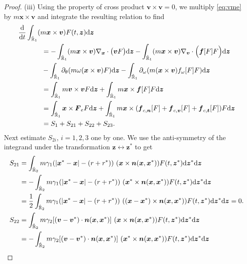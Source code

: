 \documentclass[a4paper,11pt]{article}
\numberwithin{equation}{section}
\theoremstyle{definition}
\newcommand{\bfx}{\boldsymbol{x}}
\newcommand{\bfz}{\boldsymbol{z}}
\newcommand{\bfv}{\boldsymbol{v}}
\newcommand{\bfn}{\boldsymbol{n}}
\newcommand{\bft}{\boldsymbol{t}}
\newcommand{\bff}{\boldsymbol{f}}
\newcommand{\bfF}{\boldsymbol{F}}
\newcommand{\bbr}{\mathbb R}
\def\d{{  \rm d}}
\begin{document}
\begin{proof}
\vspace{0.1cm}
\noindent (iii) 
Using the property of cross product $\bfv\times \bfv=0$, we multiply \eqref{eq:vme} by $m\bfx\times \bfv$ and integrate the resulting relation to find
\begin{align*}
&\frac{\d}{\d t}\int_{\hat{\bbr}_1} (m\bfx\times \bfv)F(t,\bfz) \d\bfz\\
&\hspace{1.2cm}=-\int_{\hat{\bbr}_1}(m\bfx\times \bfv)\nabla_{\bfx} \cdot \big (\bfv F \big)  \d\bfz
-  \int_{\hat{\bbr}_1}(m\bfx\times \bfv)\nabla_{\bfv} \cdot  \Big ( \bff[F] F  \Big ) \d\bfz\\
&\hspace{1.2cm}-\int_{\hat{\bbr}_1}\partial_\theta (m\omega (\bfx\times \bfv) F) \d\bfz
- \int_{\hat{\bbr}_1}\partial_{\omega} (m(\bfx\times \bfv) f_{\omega}[F] F)\d\bfz\\
&\hspace{1.2cm}= \int_{\hat{\bbr}_1}m\bfv\times \bfv F   \d\bfz
+ \int_{\hat{\bbr}_1} m\bfx\times \bff[F] F  \d\bfz\\
&\hspace{1.2cm}=\int_{\hat{\bbr}_1} \bfx\times \bfF_e F \d\bfz+\int_{\hat{\bbr}_1} m\bfx\times (\bff_{c, \bfn}[F]+\bff_{c, \bfv}[F]+\bff_{c, \bft}[F]) F  \d\bfz\\
&\hspace{1.2cm}=S_1+S_{21}+S_{22}+S_{23}.
\end{align*}
Next estimate $S_{2i}$, $i=1,2,3$ one by one.
We use the anti-symmetry of the integrand under the transformation $\bfz\leftrightarrow \bfz^*$ to get
\begin{align*}
S_{21} 
&=  \int_{\hat{\bbr}_2}  m\gamma_1  (|\bfx^* - \bfx| - (r + r^*)) \ (\bfx\times  \bfn(\bfx, \bfx^*))  F(t, \bfz^*)\d\bfz^*\d \bfz\\
&=  -\int_{\hat{\bbr}_2}  m\gamma_1  (|\bfx^* - \bfx| - (r + r^*)) \ (\bfx^*\times  \bfn(\bfx, \bfx^*))  F(t, \bfz^*)\d\bfz^*\d \bfz\\
&=  \frac12\int_{\hat{\bbr}_2}  m\gamma_1  (|\bfx^* - \bfx| - (r + r^*)) \ ((\bfx-\bfx^*)\times  \bfn(\bfx, \bfx^*))  F(t, \bfz^*)\d\bfz^*\d \bfz=0. \\
%
S_{22} 
&=  \int_{\hat{\bbr}_2}  m\gamma_2 [ (\bfv  - \bfv^*) \cdot \bfn(\bfx, \bfx^*)]  \ (\bfx\times \bfn(\bfx, \bfx^*)) F(t, \bfz^*)\d\bfz^*\d \bfz\\
&=  -\int_{\hat{\bbr}_2}  m\gamma_2 [ (\bfv  - \bfv^*) \cdot \bfn(\bfx, \bfx^*)]  \ (\bfx^*\times \bfn(\bfx, \bfx^*))  F(t, \bfz^*)\d\bfz^*\d \bfz\\

\end{align*}
\end{proof}
\end{document}
